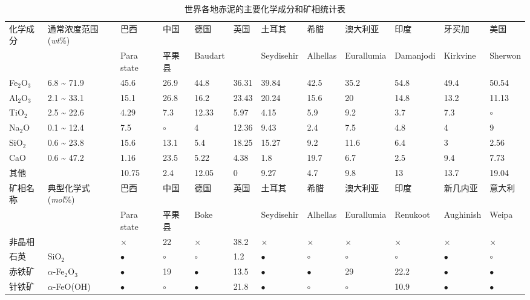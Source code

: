 \begin{table}
	\centering
	\xwu
	\setlength{\belowcaptionskip}{12pt plus 0.6ex minus 0.03ex}
	\begin{threeparttable}
		\caption{世界各地赤泥的主要化学成分和矿相统计表}\label{redmudscomposition}
		\renewcommand\arraystretch{0.85}%
		\begin{tabular}{llllllllllll}%
			\toprule[1.5pt]
			化学成分&通常浓度范围(\textit{wt}\%)&巴西&中国 &德国&英国&土耳其&希腊&澳大利亚&印度&牙买加&美国\\
			&&Para state&平果县&Baudart&&Seydisehir&Alhellas&Eurallumia&Damanjodi&Kirkvine&Sherwon\\\midrule
			Fe$ _{\mathrm{2}} $O$ _{\mathrm{3}} $ &6.8 \textasciitilde{ }71.9&45.6&26.9&44.8&36.31&39.84&42.5&35.2&54.8&49.4&50.54\\
			Al$ _{\mathrm{2}} $O$ _{\mathrm{3}} $ &2.1 \textasciitilde{ }33.1&15.1&26.8&16.2&23.43&20.24&15.6&20&14.8&13.2&11.13\\
			TiO$ _{\mathrm{2}} $   &2.5 \textasciitilde{ }22.6&4.29&7.3&12.33&5.97&4.15&5.9&9.2&3.7&7.3&$\circ$\\
			Na$ _{\mathrm{2}} $O  &0.1 \textasciitilde{ }12.4&7.5&$\circ$&4&12.36&9.43&2.4&7.5&4.8&4&9\\
			SiO$ _{\mathrm{2}} $   &0.6 \textasciitilde{ }23.8&15.6&13.1&5.4&18.25&15.27&9.2&11.6&6.4&3&2.56\\
			CaO   &0.6 \textasciitilde{ }47.2&1.16&23.5&5.22&4.38&1.8&19.7&6.7&2.5&9.4&7.73\\
			其他&&10.75&2.4&12.05&0&9.27&4.7&9.8&13&13.7&19.04\\\midrule
			矿相名称&典型化学式(\textit{mol}\%)&巴西&中国 &德国&英国&土耳其&希腊&澳大利亚&印度&新几内亚&意大利\\
			&&Para state&平果县&Boke&&Seydisehir&Alhellas&Eurallumia&Renukoot&Aughinish&Weipa\\\midrule
			非晶相&&$\times$&22&$\times$&38.2&$\times$&$\times$&$\times$&$\times$&$\times$&$\times$\\
			石英&SiO$ _{\mathrm{2}} $&$\bullet$&$\circ$&$\circ$&1.2&$\bullet$&$\circ$&$\circ$&$\circ$&$\bullet$&$\circ$\\
			赤铁矿&$ \alpha $-Fe$ _{\mathrm{2}} $O$ _{\mathrm{3}} $&$\bullet$&19&$\bullet$&13.5&$\bullet$&$\bullet$&29&22.2&$\bullet$&$\bullet$\\
			针铁矿& $ \alpha $-FeO(OH)&$\bullet$&$\circ$&$\bullet$&21.8&$\bullet$&$\circ$&$\circ$&10.9&$\bullet$&$\bullet$\\

\end{tabular}
\end{threeparttable}
\end{table}
